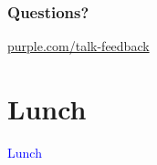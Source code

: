 \documentclass[t]{beamer}
\newcommand\blue[1]{\textcolor{blue}{#1}}
\newcommand\talksection[1]{\section{#1}
\begin{frame}
  \vfill\Huge\bf\blue{\centerline{#1}}
\end{frame}
}
\begin{document}
\begin{frame}
  \frametitle{}

  \note{

  }

\end{frame}

\begin{frame}
  \frametitle{}

  \note{

  }

\end{frame}

\begin{frame}
  \frametitle{}

  \note{

  }

\end{frame}

\begin{frame}
  \frametitle{Questions?}
  \vspace{3cm}
  \centerline{\large\url{purple.com/talk-feedback}}
\end{frame}

\talksection{Lunch}
\end{document}

